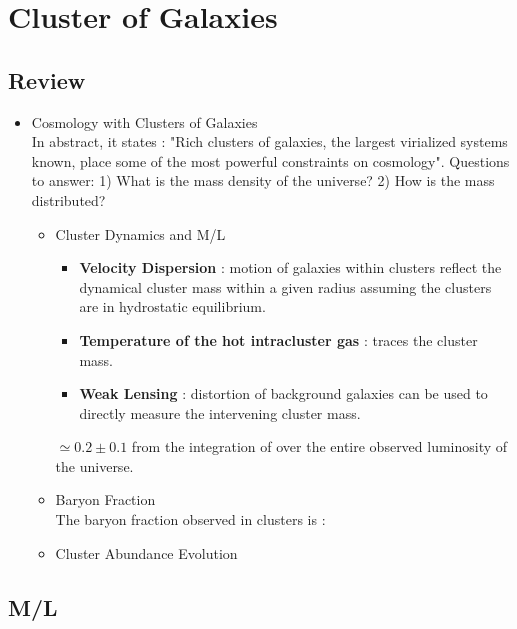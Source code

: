 \section{Cluster of Galaxies}
\subsection{Review}
\begin{itemize}
\item Cosmology with Clusters of Galaxies \citep[][bahcall00a, \#16 4/21/10]{bahcall00a}\\
In abstract, it states : "Rich clusters of galaxies, the largest
virialized systems known, place some of the most powerful constraints on
cosmology".  Questions to answer: 1) What is the mass density of the
universe?  2) How is the mass distributed? 
  \begin{itemize}
  \item Cluster Dynamics and M/L
     \begin{itemize}
     \item {\bf Velocity Dispersion} : motion of galaxies within clusters reflect
     the dynamical cluster mass within a given radius assuming the clusters
     are in hydrostatic equilibrium.
     \item {\bf Temperature of the hot intracluster gas} : traces the cluster mass.
     \item {\bf Weak Lensing} : distortion of background galaxies can be used
     to directly measure the intervening cluster mass.
     \end{itemize}
  \omegam $\simeq 0.2 \pm 0.1$ from the integration of over the entire observed 
  luminosity of the universe.
  \item Baryon Fraction\\ 
  The baryon fraction observed in clusters is :
  
  \item Cluster Abundance Evolution
  \end{itemize} 

\end{itemize}
\subsection{M/L}

